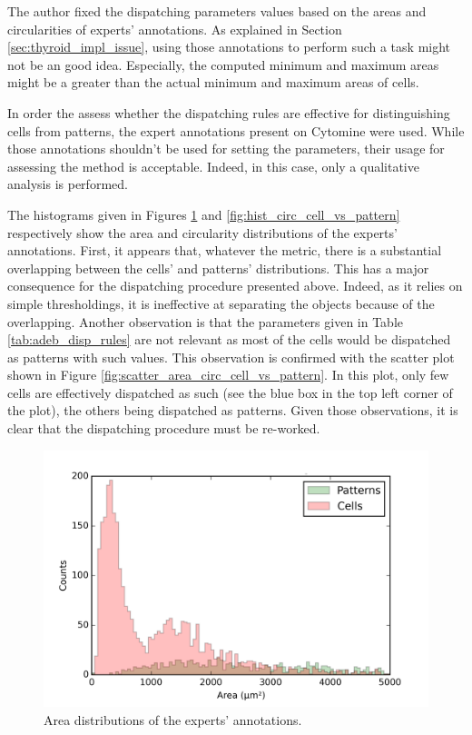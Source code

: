 The author fixed the dispatching parameters values based on the areas and circularities of experts' annotations. As explained in Section \ref{sec:thyroid_impl_issue}, using those annotations to perform such a task might not be an good idea. Especially, the computed minimum and maximum areas might be a greater than the actual minimum and maximum areas of cells. 

In order the assess whether the dispatching rules are effective for distinguishing cells from patterns, the expert annotations present on Cytomine were used. While those annotations shouldn't be used for setting the parameters, their usage for assessing the method is acceptable. Indeed, in this case, only a qualitative analysis is performed. 

The histograms given in Figures \ref{fig:hist_area_cell_vs_pattern} and \ref{fig:hist_circ_cell_vs_pattern} respectively show the area and circularity distributions of the experts' annotations. First, it appears that, whatever the metric, there is a substantial overlapping between the cells' and patterns' distributions. This has a major consequence for the dispatching procedure presented above. Indeed, as it relies on simple thresholdings, it is ineffective at separating the objects because of the overlapping. Another observation is that the parameters given in Table \ref{tab:adeb_disp_rules} are not relevant as most of the cells would be dispatched as patterns with such values. This observation is confirmed with the scatter plot shown in Figure \ref{fig:scatter_area_circ_cell_vs_pattern}. In this plot, only few cells are effectively dispatched as such (see the blue box in the top left corner of the plot), the others being dispatched as patterns. Given those observations, it is clear that the dispatching procedure must be re-worked.

\begin{figure}
	\center
	\includegraphics[scale=0.75]{image/cells_patterns_real_area_0_5000.png}
	\caption{Area distributions of the experts' annotations.}
	\label{fig:hist_area_cell_vs_pattern}
\end{figure}

